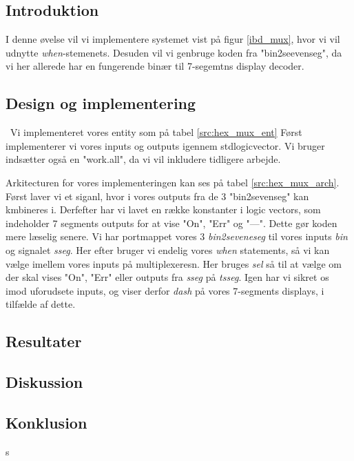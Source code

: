 \documentclass[../journal2.tex]{subfiles}
\begin{document}
\subsection{Introduktion}

I denne øvelse vil vi implementere systemet vist på figur \ref{ibd_mux}, hvor vi vil udnytte \textit{when}-stemenets. Desuden vil vi genbruge koden fra "bin2seevenseg", da vi her allerede har en fungerende binær til 7-segemtns display decoder.


\subsection{Design og implementering}
\
Vi implementeret vores entity som på tabel \ref{src:hex_mux_ent} Først implementerer vi vores inputs og outputs igennem std\textunderscore logic\textunderscore vector. Vi bruger indsætter også en "work.all", da vi vil inkludere tidligere arbejde.

\begin{table}[H]
    \centering
      \framebox{
        \rule{8pt}{0pt}
          
  }
  \caption{Entity af hex\textunderscore mux}
  \label{src:hex_mux_ent}
\end{table}

Arkitecturen for vores implementeringen kan ses på tabel \ref{src:hex_mux_arch}. Først laver vi et siganl, hvor i vores outputs fra de 3 "bin2sevenseg" kan kmbineres i. Derfefter har vi lavet en række konstanter i logic vectors, som indeholder 7 segments outputs for at vise "On", "Err" og "---". Dette gør koden mere læselig senere. Vi har portmappet vores 3 \textit{bin2seveneseg} til vores inputs \textit{bin} og signalet \textit{sseg}. Her efter bruger vi endelig vores \textit{when} statements, så vi kan vælge imellem vores inputs på multiplexeresn. Her bruges \textit{sel} så til at vælge om der skal vises "On", "Err" eller outputs fra \textit{sseg} på \textit{tsseg}. Igen har vi sikret os imod uforudsete inputs, og viser derfor \textit{dash} på vores 7-segments displays, i tilfælde af dette.

\begin{table}[H]
    \centering
      \framebox{
        \rule{8pt}{0pt}
          
  }
  \caption{Architecture af hex\textunderscore mux}
  \label{src:hex_mux_arch}
\end{table}

\subsection{Resultater}


\subsection{Diskussion}

\subsection{Konklusion}
s
\end{document}
